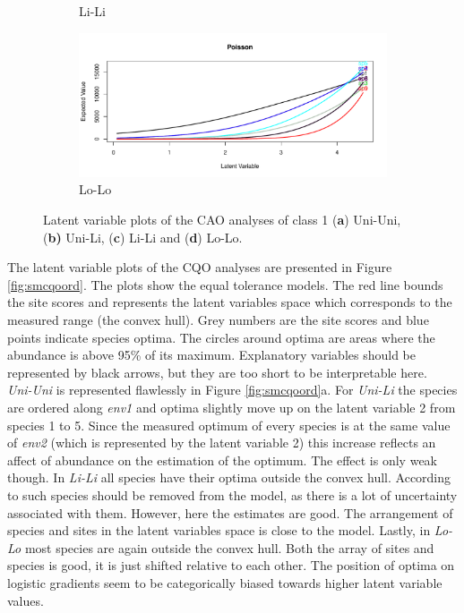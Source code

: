 \begin{figure}[h]
\begin{subfigure}{.55\textwidth}
				\caption{Li-Li}
			\end{subfigure}
			\begin{subfigure}{.55\textwidth}		
				\centering
			\includegraphics[width=1\linewidth]{"../02_Figures/CAO1SM4"}
				\caption{Lo-Lo}
			\end{subfigure}
			
			\caption{
				Latent variable plots of the CAO analyses of class 1 (\textbf{a}) Uni-Uni, (\textbf{b)} Uni-Li, (\textbf{c}) Li-Li and (\textbf{d}) Lo-Lo. 
					}
			\label{fig:smcaoord}
			
		\end{figure}
	
		The latent variable plots of the CQO analyses  are presented in Figure \ref{fig:smcqoord}.
		The plots show the equal tolerance models.
		The red line bounds the site scores and represents the latent variables space which corresponds to the measured range (the convex hull).
		Grey numbers are the site scores and blue points indicate species optima. The circles around optima are areas where the abundance is above 95\% of its maximum.
		Explanatory variables should be represented by black arrows, but they are too short to be interpretable here. \\
		\textit{Uni-Uni} is represented flawlessly in Figure \ref{fig:smcqoord}a. 
		For \textit{Uni-Li} the species are ordered along \textit{env1} and optima slightly move up on the latent variable 2 from species 1 to 5.
		Since the measured optimum of every species is at the same value of \textit{env2} (which is represented by the latent variable 2) this increase reflects an affect of abundance on the estimation of the optimum. 
		The effect is only weak though.
		In \textit{Li-Li} all species have their optima outside the convex hull. 
		According to \citet{yee2015vector} such species should be removed from the model, as there is a lot of uncertainty associated with them. 
		However, here the estimates are good. 
		The arrangement of species and sites in the latent variables space is close to the model.
		Lastly, in \textit{Lo-Lo} most species are again outside the convex hull. 
		Both the array of sites and species is good, it is just shifted relative to each other. 
		The position of optima on logistic gradients seem to be categorically biased towards higher latent variable values.
	
